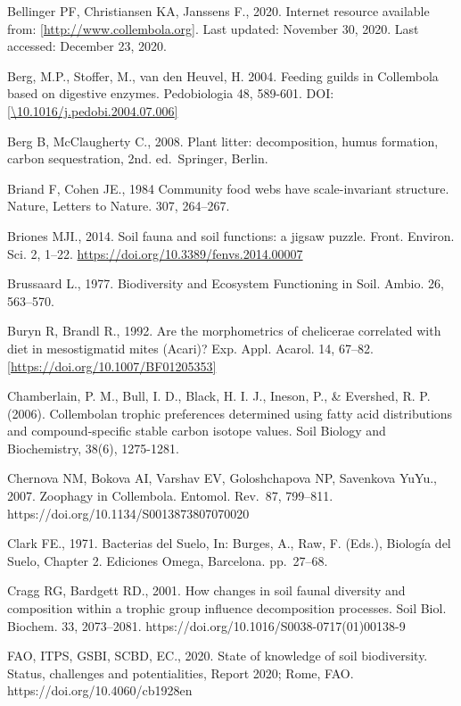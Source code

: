 \documentclass[10pt,oneside]{article}
\begin{document}
Bellinger PF, Christiansen KA, Janssens F., 2020. Internet resource
available from:
\href{http://www.collembola.org/}{{[}http://www.collembola.org{]}}. Last
updated: November 30, 2020. Last accessed: December 23, 2020.

Berg, M.P., Stoffer, M., van den Heuvel, H. 2004. Feeding guilds in
Collembola based on digestive enzymes. Pedobiologia 48, 589-601. DOI:
\href{http://dx.doi.org/10.1016\%2Fj.pedobi.2004.07.006}{{[}\textbackslash10.1016/j.pedobi.2004.07.006{]}}

Berg B, McClaugherty C., 2008. Plant litter: decomposition, humus
formation, carbon sequestration, 2nd. ed.~Springer, Berlin.

Briand F, Cohen JE., 1984 Community food webs have scale-invariant
structure. Nature, Letters to Nature. 307, 264--267.

Briones MJI., 2014. Soil fauna and soil functions: a jigsaw puzzle.
Front. Environ. Sci. 2, 1--22.
\url{https://doi.org/10.3389/fenvs.2014.00007}

Brussaard L., 1977. Biodiversity and Ecosystem Functioning in Soil.
Ambio. 26, 563--570.

Buryn R, Brandl R., 1992. Are the morphometrics of chelicerae correlated
with diet in mesostigmatid mites (Acari)? Exp. Appl. Acarol. 14, 67--82.
\href{https://doi.org/10.1007/BF01205353}{{[}https://doi.org/10.1007/BF01205353{]}}

Chamberlain, P. M., Bull, I. D., Black, H. I. J., Ineson, P., \&
Evershed, R. P. (2006). Collembolan trophic preferences determined using
fatty acid distributions and compound-specific stable carbon isotope
values. Soil Biology and Biochemistry, 38(6), 1275-1281.

Chernova NM, Bokova AI, Varshav EV, Goloshchapova NP, Savenkova YuYu.,
2007. Zoophagy in Collembola. Entomol. Rev.~87, 799--811.
https://doi.org/10.1134/S0013873807070020

Clark FE., 1971. Bacterias del Suelo, In: Burges, A., Raw, F. (Eds.),
Biología del Suelo, Chapter 2. Ediciones Omega, Barcelona. pp.~27--68.

Cragg RG, Bardgett RD., 2001. How changes in soil faunal diversity and
composition within a trophic group influence decomposition processes.
Soil Biol. Biochem. 33, 2073--2081.
https://doi.org/10.1016/S0038-0717(01)00138-9

FAO, ITPS, GSBI, SCBD, EC., 2020. State of knowledge of soil
biodiversity. Status, challenges and potentialities, Report 2020; Rome,
FAO. https://doi.org/10.4060/cb1928en
\end{document}
